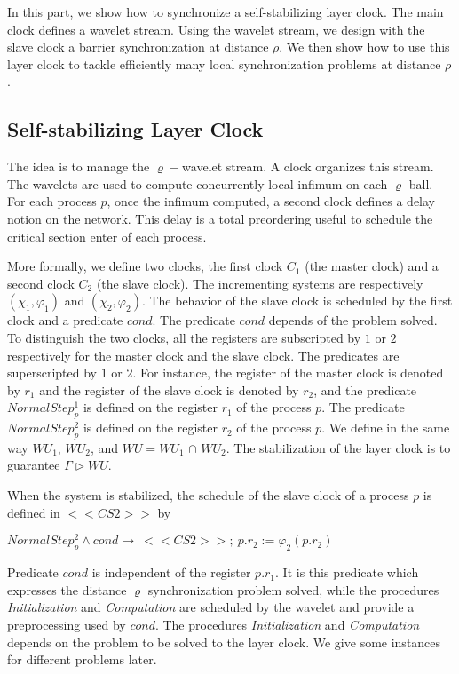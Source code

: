 \documentclass[11pt]{article}
\begin{document}
In this part, we show how to synchronize a self-stabilizing layer clock. The main clock defines a wavelet stream. 
Using the wavelet stream, we design with the slave clock a barrier synchronization at distance $\rho $. 
We then show how to use this layer clock to tackle efficiently many local synchronization problems at distance $\rho$.

\subsection{Self-stabilizing Layer Clock}
\label{subsec:layer_clock}

The idea is to manage the $\varrho-$wavelet stream. A clock organizes
this stream.  The wavelets are used to compute concurrently local infimum on
each  $\varrho$-ball. For each process $p$, once the infimum computed, a second
clock defines a delay notion on the network. This delay is a total
preordering useful to schedule the critical section enter of each process. 





More formally, we define two clocks, the first clock $C_1$ (the master clock) and a second clock $C_2$ (the slave clock).  
The incrementing systems are respectively $\left( \chi_{1},\varphi _{1}\right) $ 
and    $\left( \chi _{2},\varphi _{2}\right) $. The behavior of the slave clock  is scheduled by
the first clock and a predicate $cond$. The predicate $cond$ depends of the problem solved. 
To distinguish the two clocks, all the registers are subscripted by $1$ or $2$ respectively for the
master clock and the slave clock. The predicates are superscripted by $1$ or $2$.  For instance, the register of the master
clock is denoted by $r_{1}$ and the register of the slave clock is denoted
by $r_{2}$, and the predicate $NormalStep_{p}^{1}$ is defined on the register 
$r_{1}$ of the process $p$.  The predicate $NormalStep_{p}^{2}$ is defined on
the register $r_{2}$ of the process $p$.  We define in the same way $WU_{1}$, $WU_{2}$,
and $WU=WU_{1}$ $\cap $ $WU_{2}$.
The stabilization of the layer clock is to guarantee $\Gamma \rhd WU.$

When the system is stabilized,  the schedule of the slave clock of a process $p$ is defined in $<<CS2>>$ by 
\begin{center}
$
NormalStep_{p}^{2}\wedge cond \rightarrow\ <<CS2>>;\ p.r_{2}:=\varphi _{2}\left(
p.r_{2}\right) 
$
\end{center}
Predicate $cond$ is independent of the register $p.r_1$. It is this predicate which expresses  the distance $\varrho$  synchronization problem solved, 
while the procedures \emph{Initialization} and \emph{Computation} are 
scheduled by the wavelet and  provide a preprocessing used by $cond$.
The procedures \emph{Initialization} and \emph{Computation} depends on the problem to be solved to the layer clock.  
We give some instances for different problems later.  
\end{document}
